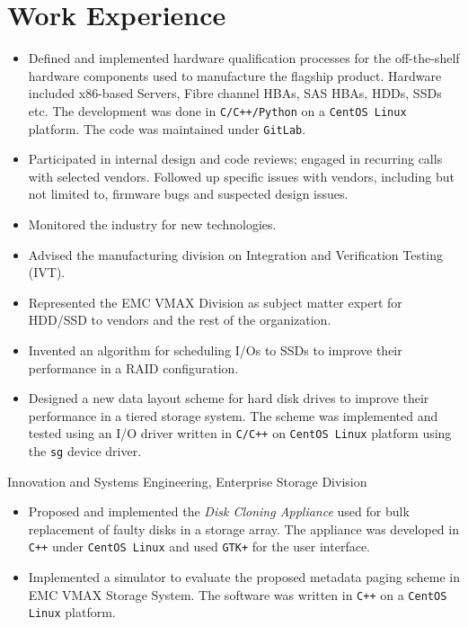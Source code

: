 \section{Work Experience}

{
	\begin{itemize}
		\item Defined and implemented hardware qualification processes for the
			off-the-shelf hardware components used to manufacture the flagship
			product. Hardware included x86-based Servers, Fibre channel HBAs,
			SAS HBAs, HDDs, SSDs etc.  The development was done in \texttt{C/C++/Python}
			on a \texttt{CentOS Linux} platform. The code was maintained under \texttt{GitLab}.
		\item Participated in internal design and code reviews; engaged in
			recurring calls with selected vendors. Followed up specific issues 
			with vendors, including but not limited to, firmware bugs and
			suspected design issues.
		\item  Monitored the industry for new technologies.
		\item Advised the manufacturing division on Integration and Verification Testing (IVT).
	\end{itemize}
}
{
	\begin{itemize}
		\item Represented the EMC VMAX Division as subject matter expert for HDD/SSD to vendors
			and the rest of the organization.
		\item Invented an algorithm for scheduling I/Os to SSDs to improve
			their performance in a RAID configuration.
		\item Designed a new data layout scheme for hard disk drives to improve
			their performance in a tiered storage system.
			The scheme was implemented and tested using an I/O driver written
			in \texttt{C/C++} on \texttt{CentOS Linux} platform using the \texttt{sg} device driver.
	\end{itemize}
}
{Innovation and Systems Engineering, Enterprise Storage Division}
{
	\begin{itemize}
        \item Proposed and implemented the {\em Disk Cloning Appliance} used for bulk
            replacement of faulty disks in a storage array. The appliance was
			developed in \texttt{C++} under \texttt{CentOS Linux} and used \texttt{GTK+} for the user
			interface.
		\item Implemented a simulator to evaluate the proposed metadata paging
			scheme in EMC VMAX Storage System. The software was written in
			\texttt{C++} on a \texttt{CentOS Linux} platform.
	\end{itemize}
}
